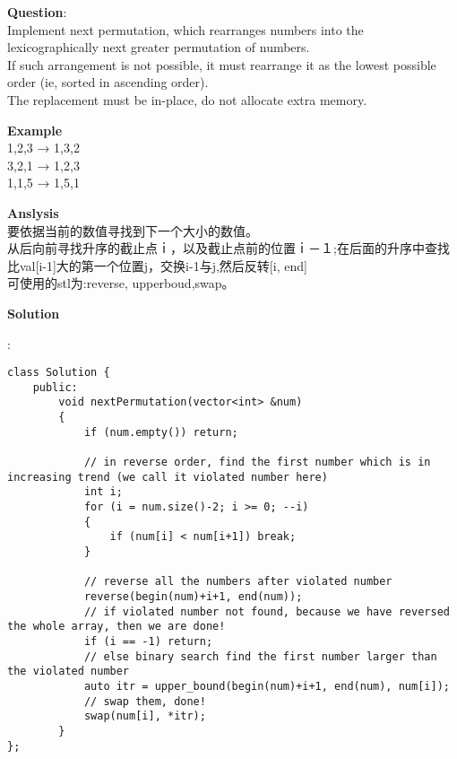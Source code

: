     
\begin{description}
    \item{\textbf{Question}}:\\%
		Implement next permutation, which rearranges numbers into the lexicographically next greater permutation of numbers.\\
		If such arrangement is not possible, it must rearrange it as the lowest possible order (ie, sorted in ascending order).\\
		The replacement must be in-place, do not allocate extra memory.\\

    \item{\textbf{Example}}\\
		1,2,3 → 1,3,2\\
		3,2,1 → 1,2,3\\
		1,1,5 → 1,5,1\\

    \item{\textbf{Anslysis}}\\
		要依据当前的数值寻找到下一个大小的数值。\\
		从后向前寻找升序的截止点ｉ，以及截止点前的位置ｉ－１;在后面的升序中查找比val[i-1]大的第一个位置j，交换i-1与j,然后反转[i, end]\\

		可使用的stl为:reverse, upperboud,swap。

    \item{\textbf{Solution}}\\
	\item{} : \\
		\begin{lstlisting}
class Solution {
	public:
		void nextPermutation(vector<int> &num) 
		{
			if (num.empty()) return;

			// in reverse order, find the first number which is in increasing trend (we call it violated number here)
			int i;
			for (i = num.size()-2; i >= 0; --i)
			{
				if (num[i] < num[i+1]) break;
			}

			// reverse all the numbers after violated number
			reverse(begin(num)+i+1, end(num));
			// if violated number not found, because we have reversed the whole array, then we are done!
			if (i == -1) return;
			// else binary search find the first number larger than the violated number
			auto itr = upper_bound(begin(num)+i+1, end(num), num[i]);
			// swap them, done!
			swap(num[i], *itr);
		}
};
		\end{lstlisting}
\end{description}

